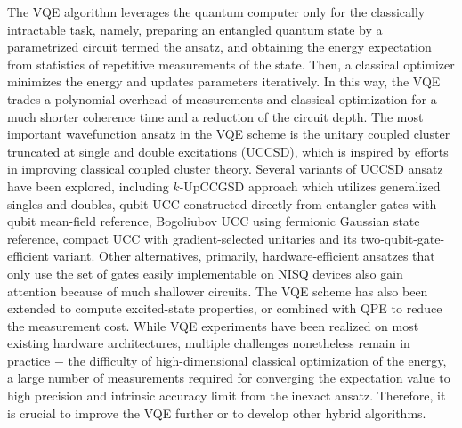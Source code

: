 \documentclass[journal=jctcce,manuscript=article]{achemso}
\begin{document}
The VQE algorithm leverages the quantum computer only for the classically intractable task, namely, preparing an entangled quantum state by a parametrized circuit termed the ansatz, and obtaining the energy expectation from statistics of repetitive measurements of the state.\cite{McClean:2015bs}
Then, a classical optimizer minimizes the energy and updates parameters iteratively. In this way, the VQE trades a polynomial overhead of measurements and classical optimization for a much shorter coherence time and a reduction of the circuit depth.\cite{McArdle:2019we}
The most important wavefunction ansatz in the VQE scheme is the unitary coupled cluster truncated at single and double excitations (UCCSD),\cite{McClean:2015bs, OMalley:2016dc, Barkoutsos:2018hm, Romero:2019hk} which is inspired by efforts in improving classical coupled cluster theory.\cite{bartlett1989alternative, kutzelnigg1991error, Szalay:1995vu, Taube:2006bi, Cooper:2010ck, Evangelista:2011eh, Harsha:2018dv}
Several variants of UCCSD ansatz have been explored, including $k$-UpCCGSD approach which utilizes generalized singles and doubles,\cite{Lee:2018cy} qubit UCC constructed directly from entangler gates\cite{Ryabinkin:2018jw,Ryabinkin:2019vh} with qubit mean-field reference,\cite{Ryabinkin:2018tv} Bogoliubov UCC using fermionic Gaussian state reference,\cite{DallaireDemers:2019iw} compact UCC with gradient-selected unitaries\cite{Grimsley:2019ed} and its two-qubit-gate-efficient variant\cite{Tang:2019ug}.
Other alternatives, primarily, hardware-efficient ansatzes that only use the set of gates easily implementable on NISQ devices\cite{Kandala:2017gh, M:2019hw, Rattew:2019wv} also gain attention because of much shallower circuits.
The VQE scheme has also been extended to compute excited-state properties,\cite{McClean:2017ct, Higgott:2018fca, Colless:2018hp, Parrish:2019bw, Nakanishi:2019wo, Jouzdani:2019tp, GreeneDiniz:2019tg, Tilly:2020tj} or combined with QPE to reduce the measurement cost.\cite{Wang:2019ha, Santagati:2018ih}
While VQE experiments have been realized on most existing hardware architectures,\cite{Peruzzo:2014kc,Yung:2014iv,OMalley:2016dc,Hempel:2018to,Colless:2018hp,Santagati:2018ih,Shen:2017cc,M:2019hw} multiple challenges nonetheless remain in practice $-$ the difficulty of high-dimensional classical optimization of the energy,\cite{McClean:2018kf} a large number of measurements required for converging the expectation value to high precision\cite{Barkoutsos:2019wq} and intrinsic accuracy limit from the inexact ansatz.\cite{Evangelista:2019kz} Therefore, it is crucial to improve the VQE further or to develop other hybrid algorithms.
\end{document}
